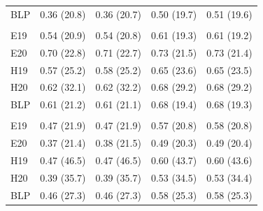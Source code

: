 \begin{table}
{\begin{tabular}{lllll}
\hspace{1em}BLP & 0.36 (20.8) & 0.36 (20.7) & 0.50 (19.7) & 0.51 (19.6)\\
\addlinespace[0.3em]
\multicolumn{5}{l}{\textbf{TV}}\\
\hspace{1em}E19 & 0.54 (20.9) & 0.54 (20.8) & 0.61 (19.3) & 0.61 (19.2)\\
\hspace{1em}E20 & 0.70 (22.8) & 0.71 (22.7) & 0.73 (21.5) & 0.73 (21.4)\\
\hspace{1em}H19 & 0.57 (25.2) & 0.58 (25.2) & 0.65 (23.6) & 0.65 (23.5)\\
\hspace{1em}H20 & 0.62 (32.1) & 0.62 (32.2) & 0.68 (29.2) & 0.68 (29.2)\\
\hspace{1em}BLP & 0.61 (21.2) & 0.61 (21.1) & 0.68 (19.4) & 0.68 (19.3)\\
\addlinespace[0.3em]
\multicolumn{5}{l}{\textbf{TY}}\\
\hspace{1em}E19 & 0.47 (21.9) & 0.47 (21.9) & 0.57 (20.8) & 0.58 (20.8)\\
\hspace{1em}E20 & 0.37 (21.4) & 0.38 (21.5) & 0.49 (20.3) & 0.49 (20.4)\\
\hspace{1em}H19 & 0.47 (46.5) & 0.47 (46.5) & 0.60 (43.7) & 0.60 (43.6)\\
\hspace{1em}H20 & 0.39 (35.7) & 0.39 (35.7) & 0.53 (34.5) & 0.53 (34.4)\\
\hspace{1em}BLP & 0.46 (27.3) & 0.46 (27.3) & 0.58 (25.3) & 0.58 (25.3)\\
\bottomrule
\end{tabular}}
\end{table}
